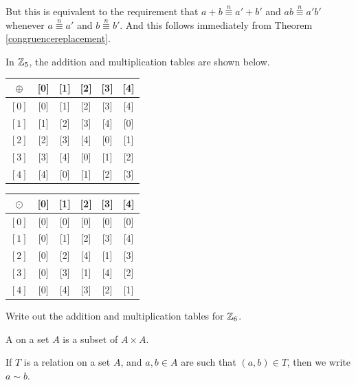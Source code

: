 \documentclass[11pt,fleqn,dvipsnames,usenames]{article}
\newcommand{\p}{\noindent}
\begin{document}
\p But this is equivalent to the requirement that $a + b\overset{n}{\equiv} a' + b'$ and $ab\overset{n}{\equiv} a'b'$ whenever $a\overset{n}{\equiv} a'$ and $b\overset{n}{\equiv}b'$.  And this follows immediately from Theorem \ref{congruencereplacement}.
%
\begin{example}In $\mathbb{Z}_{5}$, the addition and multiplication tables are shown below.
\vsmsp

\begin{center}
\bgroup
\def\arraystretch{1.5}
\begin{tabular}{c|ccccc}
$\oplus$ & [0] & [1] & [2] & [3] & [4]\\
\hline
$[0]$ & [0] & [1] & [2] & [3] & [4]\\
$[1]$ & [1] & [2] & [3] & [4] & [0]\\
$[2]$ & [2] & [3] & [4] & [0] & [1]\\
$[3]$ & [3] & [4] & [0] & [1] & [2]\\
$[4]$ & [4] & [0] & [1] & [2] & [3]
\end{tabular}
\hspace{3cm}
\begin{tabular}{c|ccccc}
$\odot$ & [0] & [1] & [2] & [3] & [4]\\
\hline
$[0]$ & [0] & [0] & [0] & [0] & [0]\\
$[1]$ & [0] & [1] & [2] & [3] & [4]\\
$[2]$ & [0] & [2] & [4] & [1] & [3]\\
$[3]$ & [0] & [3] & [1] & [4] & [2]\\
$[4]$ & [0] & [4] & [3] & [2] & [1]
\end{tabular}
\egroup
\end{center}
\end{example}
%
\exercise Write out the addition and multiplication tables for $\mathbb{Z}_6$.
\vsp
%
\begin{definition}
A  on a set $A$ is a subset of $A\times A$.
\end{definition}
\vsp

\notation If $T$ is a relation on a set $A$, and $a,b\in A$ are such that $(a,b)\in T$, then we write $a\sim b$.
\vsp
\end{document}
